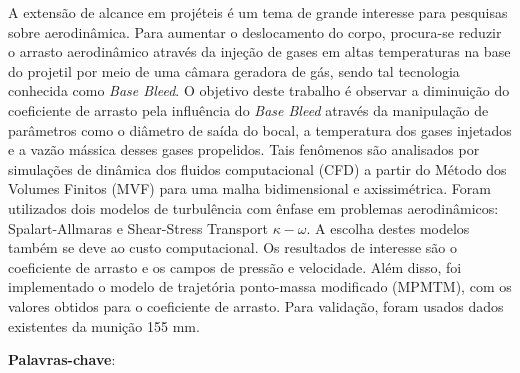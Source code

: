 \setlength{\absparsep}{18pt} %
\begin{resumo}
\SingleSpacing

A extensão de alcance em projéteis é um tema de grande interesse para pesquisas sobre aerodinâmica. Para aumentar o deslocamento do corpo, procura-se reduzir o arrasto aerodinâmico através da injeção de gases em altas temperaturas na base do projetil por meio de uma câmara geradora de gás, sendo tal tecnologia conhecida como \textit{Base Bleed}. O objetivo deste trabalho é observar a diminuição do coeficiente de arrasto pela influência do \textit{Base Bleed} através da manipulação de parâmetros como o diâmetro de saída do bocal, a temperatura dos gases injetados e a vazão mássica desses gases propelidos. Tais fenômenos são analisados por simulações de dinâmica dos fluidos computacional (CFD) a partir do Método dos Volumes Finitos (MVF) para uma malha bidimensional e axissimétrica. Foram utilizados dois modelos de turbulência com ênfase em problemas aerodinâmicos: Spalart-Allmaras e Shear-Stress Transport \(\kappa-\omega\). A escolha destes modelos também se deve ao custo computacional. Os resultados de interesse são o coeficiente de arrasto e os campos de pressão e velocidade. Além disso, foi implementado o modelo de trajetória ponto-massa modificado (MPMTM), com os valores obtidos para o coeficiente de arrasto. Para validação, foram usados dados existentes da munição 155 mm.

\textbf{Palavras-chave}: \imprimirpalavraschave
\end{resumo}

